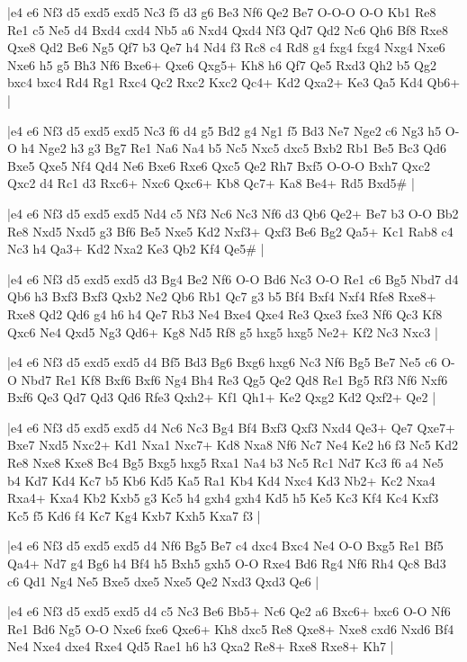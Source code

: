 \whitename{}
\blackname{}
\makegametitle
|e4 e6 Nf3 d5 exd5 exd5 Nc3 f5 d3 g6 Be3 Nf6 Qe2 Be7 O-O-O O-O Kb1 Re8 Re1 c5 Ne5 d4 Bxd4 cxd4 Nb5 a6 Nxd4 Qxd4 Nf3 Qd7 Qd2 Nc6 Qh6 Bf8 Rxe8 Qxe8 Qd2 Be6 Ng5 Qf7 b3 Qe7 h4 Nd4 f3 Rc8 c4 Rd8 g4 fxg4 fxg4 Nxg4 Nxe6 Nxe6 h5 g5 Bh3 Nf6 Bxe6+ Qxe6 Qxg5+ Kh8 h6 Qf7 Qe5 Rxd3 Qh2 b5 Qg2 bxc4 bxc4 Rd4 Rg1 Rxc4 Qc2 Rxc2 Kxc2 Qc4+ Kd2 Qxa2+ Ke3 Qa5 Kd4 Qb6+  |

\whitename{}
\blackname{}
\makegametitle
|e4 e6 Nf3 d5 exd5 exd5 Nc3 f6 d4 g5 Bd2 g4 Ng1 f5 Bd3 Ne7 Nge2 c6 Ng3 h5 O-O h4 Nge2 h3 g3 Bg7 Re1 Na6 Na4 b5 Nc5 Nxc5 dxc5 Bxb2 Rb1 Be5 Bc3 Qd6 Bxe5 Qxe5 Nf4 Qd4 Ne6 Bxe6 Rxe6 Qxc5 Qe2 Rh7 Bxf5 O-O-O Bxh7 Qxc2 Qxc2 d4 Rc1 d3 Rxc6+ Nxc6 Qxc6+ Kb8 Qc7+ Ka8 Be4+ Rd5 Bxd5\#  |

\whitename{}
\blackname{}
\makegametitle
|e4 e6 Nf3 d5 exd5 exd5 Nd4 c5 Nf3 Nc6 Nc3 Nf6 d3 Qb6 Qe2+ Be7 b3 O-O Bb2 Re8 Nxd5 Nxd5 g3 Bf6 Be5 Nxe5 Kd2 Nxf3+ Qxf3 Be6 Bg2 Qa5+ Kc1 Rab8 c4 Nc3 h4 Qa3+ Kd2 Nxa2 Ke3 Qb2 Kf4 Qe5\#  |

\whitename{}
\blackname{}
\makegametitle
|e4 e6 Nf3 d5 exd5 exd5 d3 Bg4 Be2 Nf6 O-O Bd6 Nc3 O-O Re1 c6 Bg5 Nbd7 d4 Qb6 h3 Bxf3 Bxf3 Qxb2 Ne2 Qb6 Rb1 Qc7 g3 b5 Bf4 Bxf4 Nxf4 Rfe8 Rxe8+ Rxe8 Qd2 Qd6 g4 h6 h4 Qe7 Rb3 Ne4 Bxe4 Qxe4 Re3 Qxe3 fxe3 Nf6 Qc3 Kf8 Qxc6 Ne4 Qxd5 Ng3 Qd6+ Kg8 Nd5 Rf8 g5 hxg5 hxg5 Ne2+ Kf2 Nc3 Nxc3  |

\whitename{}
\blackname{}
\makegametitle
|e4 e6 Nf3 d5 exd5 exd5 d4 Bf5 Bd3 Bg6 Bxg6 hxg6 Nc3 Nf6 Bg5 Be7 Ne5 c6 O-O Nbd7 Re1 Kf8 Bxf6 Bxf6 Ng4 Bh4 Re3 Qg5 Qe2 Qd8 Re1 Bg5 Rf3 Nf6 Nxf6 Bxf6 Qe3 Qd7 Qd3 Qd6 Rfe3 Qxh2+ Kf1 Qh1+ Ke2 Qxg2 Kd2 Qxf2+ Qe2  |

\whitename{}
\blackname{}
\makegametitle
|e4 e6 Nf3 d5 exd5 exd5 d4 Nc6 Nc3 Bg4 Bf4 Bxf3 Qxf3 Nxd4 Qe3+ Qe7 Qxe7+ Bxe7 Nxd5 Nxc2+ Kd1 Nxa1 Nxc7+ Kd8 Nxa8 Nf6 Nc7 Ne4 Ke2 h6 f3 Nc5 Kd2 Re8 Nxe8 Kxe8 Bc4 Bg5 Bxg5 hxg5 Rxa1 Na4 b3 Nc5 Rc1 Nd7 Kc3 f6 a4 Ne5 b4 Kd7 Kd4 Kc7 b5 Kb6 Kd5 Ka5 Ra1 Kb4 Kd4 Nxc4 Kd3 Nb2+ Kc2 Nxa4 Rxa4+ Kxa4 Kb2 Kxb5 g3 Kc5 h4 gxh4 gxh4 Kd5 h5 Ke5 Kc3 Kf4 Kc4 Kxf3 Kc5 f5 Kd6 f4 Kc7 Kg4 Kxb7 Kxh5 Kxa7 f3  |

\whitename{}
\blackname{}
\makegametitle
|e4 e6 Nf3 d5 exd5 exd5 d4 Nf6 Bg5 Be7 c4 dxc4 Bxc4 Ne4 O-O Bxg5 Re1 Bf5 Qa4+ Nd7 g4 Bg6 h4 Bf4 h5 Bxh5 gxh5 O-O Rxe4 Bd6 Rg4 Nf6 Rh4 Qc8 Bd3 c6 Qd1 Ng4 Ne5 Bxe5 dxe5 Nxe5 Qe2 Nxd3 Qxd3 Qe6  |

\whitename{}
\blackname{}
\makegametitle
|e4 e6 Nf3 d5 exd5 exd5 d4 c5 Nc3 Be6 Bb5+ Nc6 Qe2 a6 Bxc6+ bxc6 O-O Nf6 Re1 Bd6 Ng5 O-O Nxe6 fxe6 Qxe6+ Kh8 dxc5 Re8 Qxe8+ Nxe8 cxd6 Nxd6 Bf4 Ne4 Nxe4 dxe4 Rxe4 Qd5 Rae1 h6 h3 Qxa2 Re8+ Rxe8 Rxe8+ Kh7  |

